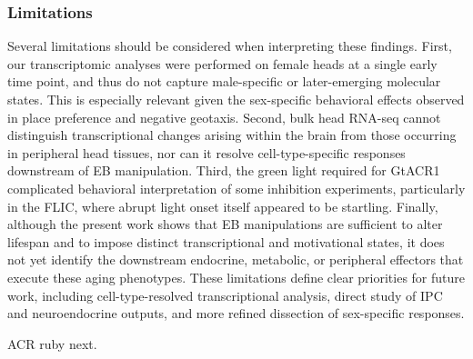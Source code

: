 \subsubsection*{Limitations}
Several limitations should be considered when interpreting these findings. First, our transcriptomic analyses were performed on female heads at a single early time point, and thus do not capture male-specific or later-emerging molecular states. This is especially relevant given the sex-specific behavioral effects observed in place preference and negative geotaxis. Second, bulk head RNA-seq cannot distinguish transcriptional changes arising within the brain from those occurring in peripheral head tissues, nor can it resolve cell-type-specific responses downstream of EB manipulation. Third, the green light required for GtACR1 complicated behavioral interpretation of some inhibition experiments, particularly in the FLIC, where abrupt light onset itself appeared to be startling. Finally, although the present work shows that EB manipulations are sufficient to alter lifespan and to impose distinct transcriptional and motivational states, it does not yet identify the downstream endocrine, metabolic, or peripheral effectors that execute these aging phenotypes. These limitations define clear priorities for future work, including cell-type-resolved transcriptional analysis, direct study of IPC and neuroendocrine outputs, and more refined dissection of sex-specific responses.

ACR ruby next. 